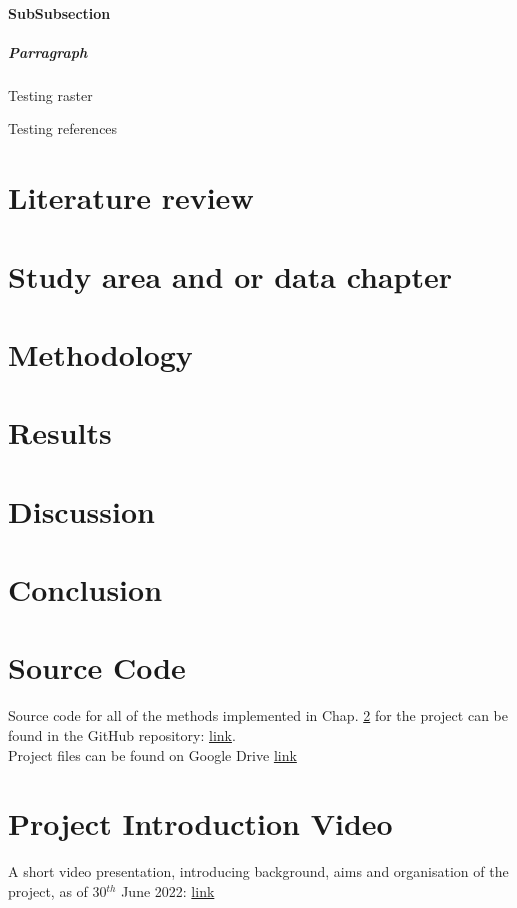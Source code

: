 \documentclass[12pt, a4paper]{report}
\begin{document}
\subsubsection{SubSubsection}
\paragraph{Parragraph}
\lipsum[5]
Testing \Gls{raster}

Testing references \cite{Kupfer2015AnImages}
\chapter{Literature review} \label{Chap2}
\chapter{Study area and or data chapter} \label{Chap3}
\chapter{Methodology} \label{Chap4}
\chapter{Results} \label{Chap5}
\chapter{Discussion} \label{Chap6}
\chapter{Conclusion} \label{Chap7}


\renewcommand{\bibname}{References}

%

\begin{appendices}
\chapter{Source Code} \label{System Requirements}
Source code for all of the methods implemented in Chap. \ref{Chap3} for the project can be found in the GitHub repository: \newline \url{link}. \newline \\
Project files can be found on Google Drive \url{link}


\chapter{Project Introduction Video}\label{sec:projectIntroduction}
A short video presentation, introducing background, aims and organisation of the project, as of 30$^{th}$ June 2022: \newline
\url{link}
\\
\\
\\


\end{appendices}
\clearpage
\printglossaries

\end{document}
